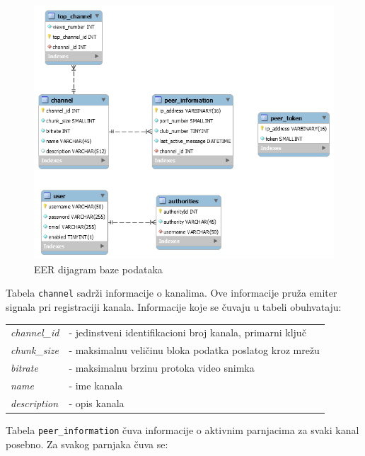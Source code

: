 \documentclass[12pt,oneside]{memoir}
\begin{document}
\begin{figure}[!ht]
  \centering
  \includegraphics[width=1.05\textwidth]{slike/eer-dijagram.png}
  \caption{EER dijagram baze podataka}
  \label{fig:eer}
\end{figure}
\par


Tabela \texttt{channel} sadrži informacije o kanalima. Ove informacije pruža emiter signala pri registraciji kanala. Informacije koje se čuvaju u tabeli obuhvataju:

\begin{center}
\begin{tabular}{ p{3.8cm} p{10.2cm} }
 \textit{channel\_id} & - jedinstveni identifikacioni broj kanala, primarni ključ \\ 
 \textit{chunk\_size} & - maksimalnu veličinu bloka podatka poslatog kroz mrežu \\  
 \textit{bitrate} & - maksimalnu brzinu protoka video snimka \\
 \textit{name} & - ime kanala \\
 \textit{description} & - opis kanala \\
\end{tabular}
\end{center}


Tabela \texttt{peer\_information} čuva informacije o aktivnim parnjacima za svaki kanal posebno. Za svakog parnjaka čuva se:
\end{document}
